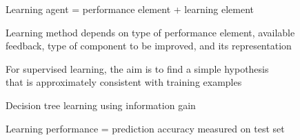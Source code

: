 \documentclass{article}
\begin{document}
\begin{huge}
Learning agent = performance element + learning element

Learning method depends on type of performance element, available\\
feedback, type of component to be improved, and its representation

For supervised learning, the aim is to find a simple hypothesis\\
that is approximately consistent with training examples

Decision tree learning using information gain 

Learning performance = prediction accuracy measured on test set

\end{huge}
\end{document}
